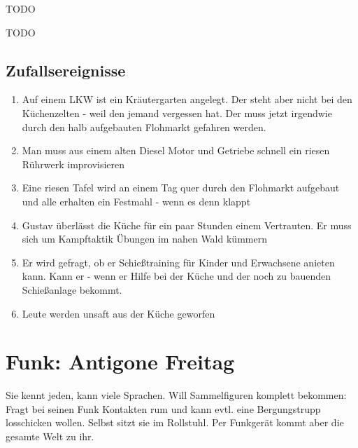 \begin{npcBox}[title=Gustav Müller]
    \begin{consequences}
    \item {}
    \item {}
    \item {}
    \end{consequences}

    \begin{npcDescription}
    TODO
    \end{npcDescription}


    \begin{equipment}
    \item TODO
    \end{equipment}
\end{npcBox}


\subsection{Zufallsereignisse}

\begin{enumerate}
\item Auf einem LKW ist ein Kräutergarten angelegt. Der steht aber nicht bei den Küchenzelten - weil den jemand vergessen hat. Der muss jetzt irgendwie durch den halb aufgebauten Flohmarkt gefahren werden.
\item Man muss aus einem alten Diesel Motor und Getriebe schnell ein riesen Rührwerk improvisieren
\item Eine riesen Tafel wird an einem Tag quer durch den Flohmarkt aufgebaut und alle erhalten ein Festmahl - wenn es denn klappt
\item Gustav überlässt die Küche für ein paar Stunden einem Vertrauten. Er muss sich um Kampftaktik Übungen im nahen Wald kümmern
\item Er wird gefragt, ob er Schießtraining für Kinder und Erwachsene anieten kann. Kann er - wenn er Hilfe bei der Küche und der noch zu bauenden Schießanlage bekommt.
\item Leute werden unsaft aus der Küche geworfen
\end{enumerate}

\newpage

\section{Funk: Antigone Freitag}

Sie kennt jeden, kann viele Sprachen. Will Sammelfiguren komplett bekommen: Fragt bei seinen Funk Kontakten rum und kann evtl. eine Bergungstrupp losschicken wollen. Selbst sitzt sie im Rollstuhl. Per Funkgerät kommt aber die gesamte Welt zu ihr.

